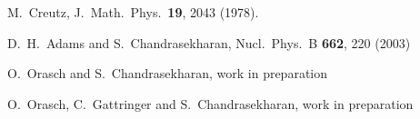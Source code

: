 \documentclass{PoS}
\begin{document}
\begin{thebibliography}{99}
  M.~Creutz,
  J.\ Math.\ Phys.\  {\bf 19}, 2043 (1978).
  
  D.~H.~Adams and S.~Chandrasekharan,
  Nucl.\ Phys.\ B {\bf 662}, 220 (2003)
  
 O.~Orasch and S.~Chandrasekharan,
	work in preparation
	
 O.~Orasch, C.~Gattringer and S.~Chandrasekharan,
 work in preparation



\end{thebibliography}
\end{document}
